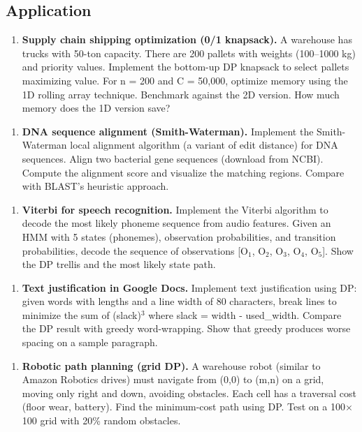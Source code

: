 \subsection{Application}

\begin{enumerate}
\item \textbf{Supply chain shipping optimization (0/1 knapsack).} A warehouse has trucks with 50-ton capacity. There are 200 pallets with weights (100–1000 kg) and priority values. Implement the bottom-up DP knapsack to select pallets maximizing value. For n = 200 and C = 50,000, optimize memory using the 1D rolling array technique. Benchmark against the 2D version. How much memory does the 1D version save?
\end{enumerate}

\begin{enumerate}
\item \textbf{DNA sequence alignment (Smith-Waterman).} Implement the Smith-Waterman local alignment algorithm (a variant of edit distance) for DNA sequences. Align two bacterial gene sequences (download from NCBI). Compute the alignment score and visualize the matching regions. Compare with BLAST's heuristic approach.
\end{enumerate}

\begin{enumerate}
\item \textbf{Viterbi for speech recognition.} Implement the Viterbi algorithm to decode the most likely phoneme sequence from audio features. Given an HMM with 5 states (phonemes), observation probabilities, and transition probabilities, decode the sequence of observations [O$_{1}$, O$_{2}$, O$_{3}$, O$_{4}$, O$_{5}$]. Show the DP trellis and the most likely state path.
\end{enumerate}

\begin{enumerate}
\item \textbf{Text justification in Google Docs.} Implement text justification using DP: given words with lengths and a line width of 80 characters, break lines to minimize the sum of (slack)$^{3}$ where slack = width - used\_width. Compare the DP result with greedy word-wrapping. Show that greedy produces worse spacing on a sample paragraph.
\end{enumerate}

\begin{enumerate}
\item \textbf{Robotic path planning (grid DP).} A warehouse robot (similar to Amazon Robotics drives) must navigate from (0,0) to (m,n) on a grid, moving only right and down, avoiding obstacles. Each cell has a traversal cost (floor wear, battery). Find the minimum-cost path using DP. Test on a 100$\times $100 grid with 20\% random obstacles.
\end{enumerate}


